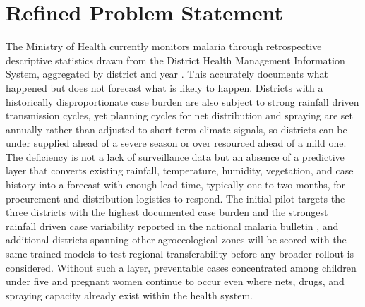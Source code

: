 \documentclass[11pt]{article}
\begin{document}
\section{Refined Problem Statement}
The Ministry of Health currently monitors malaria through retrospective descriptive statistics drawn from the District Health Management Information System, aggregated by district and year \cite{rbc2024}. This accurately documents what happened but does not forecast what is likely to happen. Districts with a historically disproportionate case burden are also subject to strong rainfall driven transmission cycles, yet planning cycles for net distribution and spraying are set annually rather than adjusted to short term climate signals, so districts can be under supplied ahead of a severe season or over resourced ahead of a mild one. The deficiency is not a lack of surveillance data but an absence of a predictive layer that converts existing rainfall, temperature, humidity, vegetation, and case history into a forecast with enough lead time, typically one to two months, for procurement and distribution logistics to respond. The initial pilot targets the three districts with the highest documented case burden and the strongest rainfall driven case variability reported in the national malaria bulletin \cite{rbc2024}, and additional districts spanning other agroecological zones will be scored with the same trained models to test regional transferability before any broader rollout is considered. Without such a layer, preventable cases concentrated among children under five and pregnant women continue to occur even where nets, drugs, and spraying capacity already exist within the health system.
\end{document}
